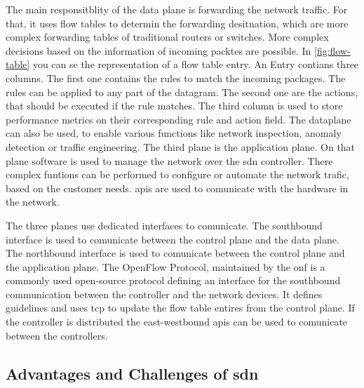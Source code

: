 \documentclass[conference]{IEEEtran}
\begin{document}
	The main responsitblity of the data plane is forwarding the network traffic. For that, it uses flow tables to determin the forwarding desitnation, which are more complex forwarding tables of traditional routers or switches. More complex decisions based on the information of incoming packtes are possible. In \ref{fig:flow-table} you can se the representation of a flow table entry. An Entry contians three columns. The first one contains the rules to match the incoming packages. The rules can be applied to any part of the datagram. The second one are the actions, that should be executed if the rule matches. The third column is used to store performance metrics on their corresponding rule and action field. \cite{nunez2023briefoverviewsoftwaredefinednetworking}
	The dataplane can also be used, to enable various functions like network inspection, anomaly detection or traffic engineering. \cite{MASOUDI20161} 
	The third plane is the application plane. On that plane software is used to manage the network over the \ac{sdn} controller. There complex funtions can be performed to configure or automate the network trafic, based on the customer needs. \acp{api} are used to comunicate with the hardware in the network.

	The three planes use dedicated interfaces to comunicate. The southbound interface is used to comunicate between the control plane and the data plane. The northbound interface is used to comunicate between the control plane and the application plane. The OpenFlow Protocol, maintained by the \ac{onf} is a commonly used open-source protocol defining an interface for the southbound communication between the controller and the network devices. It defines guidelines and uses \ac{tcp} to update the flow table entires from the control plane. 
	If the controller is distributed the east-westbound \acp{api} can be used to comunicate between the controllers. \cite{nunez2023briefoverviewsoftwaredefinednetworking}


	\subsection{Advantages and Challenges of \ac{sdn}}
\end{document}
